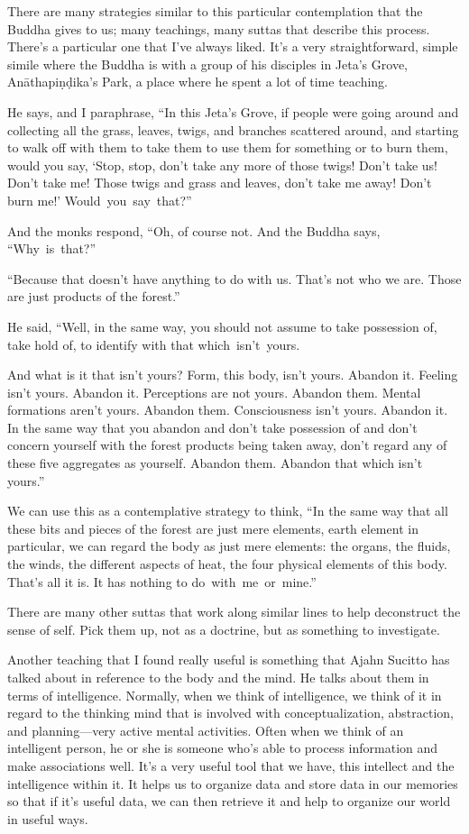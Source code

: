 There are many strategies similar to this particular contemplation that the Buddha gives to us; many teachings, many suttas that describe this process. There's a particular one that I've always liked. It's a very straightforward, simple simile where the Buddha is with a group of his disciples in Jeta's Grove, Anāthapiṇḍika's Park, a place where he spent a lot of time teaching.

He says, and I paraphrase, ``In this Jeta's Grove, if people were going around and collecting all the grass, leaves, twigs, and branches scattered around, and starting to walk off with them to take them to use them for something or to burn them, would you say, `Stop, stop, don't take any more of those twigs! Don't take us! Don't take me! Those twigs and grass and leaves, don't take me away! Don't burn me!' \mbox{Would you say that?''}


And the monks respond, ``Oh, of course not. And the Buddha says, \mbox{``Why is that?''}

``Because that doesn't have anything to do with us. That's not who we are. Those are just products of the forest.''

He said, ``Well, in the same way, you should not assume to take possession of, take hold of, to identify with that \mbox{which isn't yours.}

And what is it that isn't yours? Form, this body, isn't yours. Abandon it. Feeling isn't yours. Abandon it. Perceptions are not yours. Abandon them. Mental formations aren't yours. Abandon them. Consciousness isn't yours. Abandon it. In the same way that you abandon and don't take possession of and don't concern yourself with the forest products being taken away, don't regard any of these five aggregates as yourself. Abandon them. Abandon that which isn't yours.''

We can use this as a contemplative strategy to think, ``In the same way that all these bits and pieces of the forest are just mere elements, earth element in particular, we can regard the body as just mere elements: the organs, the fluids, the winds, the different aspects of heat, the four physical elements of this body. That's all it is. It has nothing to \mbox{do with me or mine.''}

There are many other suttas that work along similar lines to help deconstruct the sense of self. Pick them up, not as a doctrine, but as something to investigate.

Another teaching that I found really useful is something that Ajahn Sucitto has talked about in reference to the body and the mind. He talks about them in terms of intelligence. Normally, when we think of intelligence, we think of it in regard to the thinking mind that is involved with conceptualization, abstraction, and planning---very active mental activities. Often when we think of an intelligent person, he or she is someone who's able to process information and make associations well. It's a very useful tool that we have, this intellect and the intelligence within it. It helps us to organize data and store data in our memories so that if it's useful data, we can then retrieve it and help to organize our world in useful ways.

